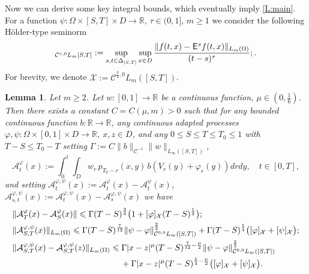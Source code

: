 \documentclass[12pt]{article}
\newtheorem{lemma}[theorem]{Lemma}
\theoremstyle{definition}
\DeclareMathOperator{\1}{\mathbbm{1}}%
\def\E{\hskip.15ex\mathsf{E}\hskip.10ex}
\def\phi{\varphi}
\renewcommand{\ge}{\geqslant}
\renewcommand{\le}{\leqslant}
\newcommand{\nn}{\nonumber}
\newcommand{\A}{\mathcal{A}}
\newcommand{\C}{\mathcal{C}}
\newcommand{\R}{\mathbb{R}}
\newcommand{\X}{\mathcal{X}}
\begin{document}
Now we can derive some key integral bounds, which eventually imply \cref{L:main}. For a function $\psi\colon\Omega\times[S,T]\times D\to\R$, $\tau\in(0,1]$, $m\ge1$ we consider the following H\"older-type seminorm 
\begin{equation*}
[f]_{\C^{\tau,0}L_m{[S,T]}}:=\sup_{s,t\in \Delta_{[S,T]}}\sup_{x\in D}\frac{\|f(t,x)-\E^s f(t,x)\|_{L_m(\Omega)}}{(t-s)^\tau};\label{norm1}. 
\end{equation*}
For brevity, we denote $\X:=\C^{\frac34,0}L_m([S,T])$.
\begin{lemma}\label{L26}
Let $m\ge2$. Let $w\colon[0,1]\to\R$ be a continuous function, $\mu\in(0,\frac16)$. 
Then there exists a constant $C=C(\mu,m)>0$ such that for any bounded continuous function $b\colon\R\to\R$, any continuous adapted processes  $\phi,\psi\colon\Omega\times[0,1]\times D\to\R$, $x,z\in D$, and any $0\le S\le T\le T_0\le 1$ with  $T-S\le T_0-T$
setting  $\Gamma:=C \|b\|_{\C^{-1}}\|w\|_{L_\infty([S,T])}$,
\begin{equation}\label{cagerm}
\A_{t}^\phi(x):=\int_0^t \int_D w_r \, p_{T_0-r}(x,y) \, b( V_r(y)+\phi_r(y))d r d y,\quad t\in [0,T],
\end{equation}
and setting $\A^{\phi,\psi}_{t}(x):=\A^\phi_t(x)-\A^\psi_t(x)$, $\A^{\phi,\psi}_{s,t}(x):=\A^{\phi,\psi}_{t}(x)-\A^{\phi,\psi}_{s}(x)$ we have
\begin{align}\label{mainres} 
&\|\A^\phi_T(x)-\A^\phi_S(x)\|\le  \Gamma  (T-S)^{\frac34}\bigl(1+[\phi]_{\X}(T-S)^{\frac{1}2}\bigr);\\
&\| \A^{\phi,\psi}_{S,T}(x)\|_{L_m(\Omega)}\le  \Gamma (T-S)^{\frac7{12}}\|\psi-\phi\|^{\frac23}_{\C^{0,0}L_m([S,T])}+ \Gamma(T-S)^{\frac{5}4}\bigl([\phi]_{\X}+[\psi]_{\X}\bigr);\label{mainresdif} \\
&\|\A^{\phi,\psi}_{S,T}(x)-\A^{\phi,\psi}_{S,T}(z)\|_{L_m(\Omega)}\le  \Gamma |x-z|^\mu (T-S)^{\frac7{12}-\frac\mu2}\|\psi-\phi\|^{\frac23}_{\C^{0,0}L_m([S,T])}\nn\\
&\hspace{30ex}+ \Gamma |x-z|^\mu                                                                                                                                               (T-S)^{\frac{5}4-\frac\mu2}\bigl([\phi]_{\X}+[\psi]_{\X}\bigr) \label{holderex}. 
\end{align}
\end{lemma}
\end{document}
